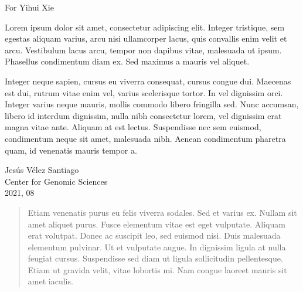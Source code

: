 \documentclass[a4paper, nobind]{templates/ociamthesis}
\begin{document}

\begin{romanpages}

\maketitle

\begin{dedication}
  For Yihui Xie
\end{dedication}

\begin{acknowledgements}
 	Lorem ipsum dolor sit amet, consectetur adipiscing elit. Integer tristique, sem egestas aliquam varius, arcu nisi ullamcorper lacus, quis convallis enim velit et arcu. Vestibulum lacus arcu, tempor non dapibus vitae, malesuada ut ipsum. Phasellus condimentum diam ex. Sed maximus a mauris vel aliquet.

  Integer neque sapien, cursus eu viverra consequat, cursus congue dui. Maecenas est dui, rutrum vitae enim vel, varius scelerisque tortor. In vel dignissim orci. Integer varius neque mauris, mollis commodo libero fringilla sed. Nunc accumsan, libero id interdum dignissim, nulla nibh consectetur lorem, vel dignissim erat magna vitae ante. Aliquam at est lectus. Suspendisse nec sem euismod, condimentum neque sit amet, malesuada nibh. Aenean condimentum pharetra quam, id venenatis mauris tempor a.

  \begin{flushright}
  Jesús Vélez Santiago \\
  Center for Genomic Sciences \\
  2021, 08
  \end{flushright}
\end{acknowledgements}


\begin{abstract}
	Etiam venenatis purus eu felis viverra sodales. Sed et varius ex. Nullam sit amet aliquet purus. Fusce elementum vitae est eget vulputate. Aliquam erat volutpat. Donec ac suscipit leo, sed euismod nisi. Duis malesuada elementum pulvinar. Ut et vulputate augue. In dignissim ligula at nulla feugiat cursus. Suspendisse sed diam ut ligula sollicitudin pellentesque. Etiam ut gravida velit, vitae lobortis mi. Nam congue laoreet mauris sit amet iaculis.
\end{abstract}


\end{romanpages}
\end{document}
